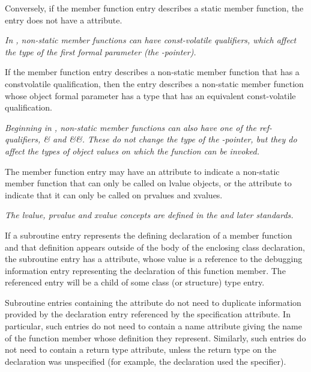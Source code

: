 Conversely, if the member function entry describes a static
member function, the entry does not have a
\DWATobjectpointer{} attribute.

\textit{In , non-static member functions can have const-volatile
qualifiers, which affect the type of the first formal parameter (the
-pointer).}
 
If the member function entry describes a non-static member
function that has a const\dash volatile qualification, then
the entry describes a non-static member function whose
object formal parameter has a type that has an equivalent
const-volatile qualification.

\textit{Beginning in 
\bb
{}, 
\eb
non-static member 
functions can also have one of the ref-qualifiers, \& and \&\&. 
These do not change the type of the
-pointer, but they do affect the types of 
object values on which the function can be invoked.}

The member function entry may have an \DWATreferenceDEFN{} attribute
to indicate a non-static member function that can only be called on
lvalue objects, or the \DWATrvaluereferenceDEFN{} attribute 
to indicate that it can only be called on prvalues and xvalues.

\textit{The lvalue, prvalue and xvalue concepts are defined in the
\bb
{} and later standards.}
\eb

If a subroutine entry represents the defining declaration
of a member function and that definition appears outside of
the body of the enclosing class declaration, the subroutine
entry has a 
\DWATspecification{} attribute, 
whose value is
a reference to the debugging information entry representing
the declaration of this function member. The referenced entry
will be a child of some class (or structure) type entry.

Subroutine entries containing the
\DWATspecification{} attribute 
do not need to duplicate information provided
by the declaration entry referenced by the specification
attribute. In particular, such entries do not need to contain
a name attribute giving the name of the function member whose 
definition they represent.  
Similarly, such entries do not need to contain a return type 
attribute, unless the return type on the declaration was 
unspecified (for example, the declaration used the 
 \autoreturntype{} specifier).

